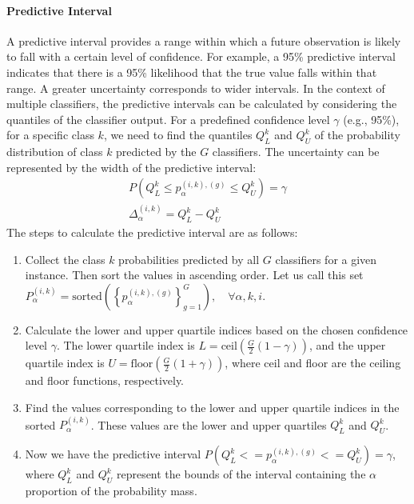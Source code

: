 \paragraph{Predictive Interval}
A predictive interval provides a range within which a future observation is likely to fall with a certain level of confidence. For example, a 95\% predictive interval indicates that there is a 95\% likelihood that the true value falls within that range. A greater uncertainty corresponds to wider intervals. In the context of multiple classifiers, the predictive intervals can be calculated by considering the quantiles of the classifier output. For a predefined confidence level $\gamma $ (e.g., 95\%), for a specific class $k $, we need to find the quantiles $Q_{L}^{k} $ and $Q_{U}^{k} $ of the probability distribution of class $k $ predicted by the $G $ classifiers. The uncertainty can be represented by the width of the predictive interval:
\begin{equation}
    \begin{aligned}
        P\left(Q_L^{k} \leq p_{\alpha}^{(i,k),(g)} \leq Q_U^{k}\right) = \gamma
        \\
        \Delta_{\alpha}^{(i,k)} = Q_L^{k} - Q_U^{k}
    \end{aligned}
    \label{eq:crowd.Eq.uncertainty}
\end{equation}
The steps to calculate the predictive interval are as follows:
\begin{enumerate}
    \item Collect the class $k $ probabilities predicted by all $G$ classifiers for a given instance. Then sort the values in ascending order. Let us call this set $P_{\alpha}^{(i,k)}=\mathrm{sorted}\left({\left\{p_{\alpha}^{(i,k),(g)}\right\}}_{g=1}^G\right),\quad\forall \alpha,k,i $.
    \item Calculate the lower and upper quartile indices based on the chosen confidence level $\gamma $. The lower quartile index is $L=\mathrm{ceil}\left(\frac{G}{2}\left(1-\gamma\right)\right) $, and the upper quartile index is $U=\mathrm{floor}\left(\frac{G}{2} (1+\gamma)\right) $, where ceil and floor are the ceiling and floor functions, respectively.
    \item Find the values corresponding to the lower and upper quartile indices in the sorted $P_{\alpha}^{(i,k)} $. These values are the lower and upper quartiles $Q_L^{k} $ and $Q_U^{k} $.
    \item Now we have the predictive interval $P\left(Q_L^{k}<=p_{\alpha}^{(i,k),(g)}<=Q_U^{k}\right)=\gamma $, where $Q_L^{k} $ and $Q_U^{k} $ represent the bounds of the interval containing the $\alpha$ proportion of the probability mass.
\end{enumerate}
